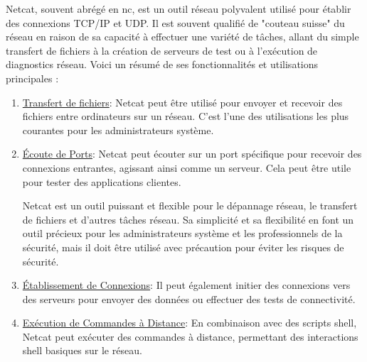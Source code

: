 \documentclass[a4paper,11pt]{article}
\begin{document}
            \noindent Netcat, souvent abrégé en nc, est un outil réseau polyvalent utilisé pour établir des connexions TCP/IP et UDP. 
            Il est souvent qualifié de "couteau suisse" du réseau en raison de sa capacité à effectuer une variété de tâches, allant 
            du simple transfert de fichiers à la création de serveurs de test ou à l'exécution de diagnostics réseau. 
            Voici un résumé de ses fonctionnalités et utilisations principales :

            \begin{enumerate}
                \item \underline{Transfert de fichiers}:  Netcat peut être utilisé pour envoyer et recevoir des 
                    fichiers entre ordinateurs sur un réseau. C'est l'une des utilisations les plus 
                    courantes pour les administrateurs système.

                \item \underline{Écoute de Ports}: Netcat peut écouter sur un port spécifique pour recevoir des connexions entrantes, agissant ainsi comme un serveur. 
                    Cela peut être utile pour tester des applications clientes.

                    \begin{tcolorbox}[colback=lightgray!6, colframe=black, left=5mm, right=5mm, top=2mm, bottom=2mm, boxrule=0.1mm]
                        Netcat est un outil puissant et flexible pour le dépannage réseau, le transfert de fichiers et d'autres tâches réseau. 
                        Sa simplicité et sa flexibilité en font un outil précieux pour les administrateurs système et les professionnels de la sécurité, 
                        mais il doit être utilisé avec précaution pour éviter les risques de sécurité.
                    \end{tcolorbox}

                \item \underline{Établissement de Connexions}: Il peut également initier des connexions vers des serveurs pour envoyer des données 
                ou effectuer des tests de connectivité.

                \item  \underline{Exécution de Commandes à Distance}: En combinaison avec des scripts shell, Netcat peut exécuter des commandes à distance, 
                permettant des interactions shell basiques sur le réseau.
            \end{enumerate}
\end{document}
